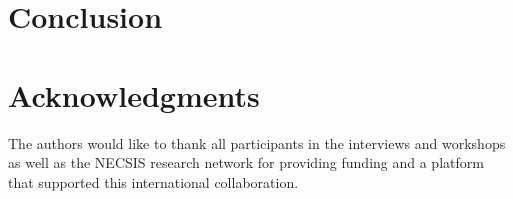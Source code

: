 \documentclass[10pt,journal,compsoc,letterpaper]{IEEEtran}
\begin{document}




\section{Conclusion}\label{sec:conclusion}


\section*{Acknowledgments}
The authors would like to thank all participants in the interviews and workshops as well as the NECSIS research network for providing funding and a platform that supported this international collaboration.




\newpage





% 
\end{document}
